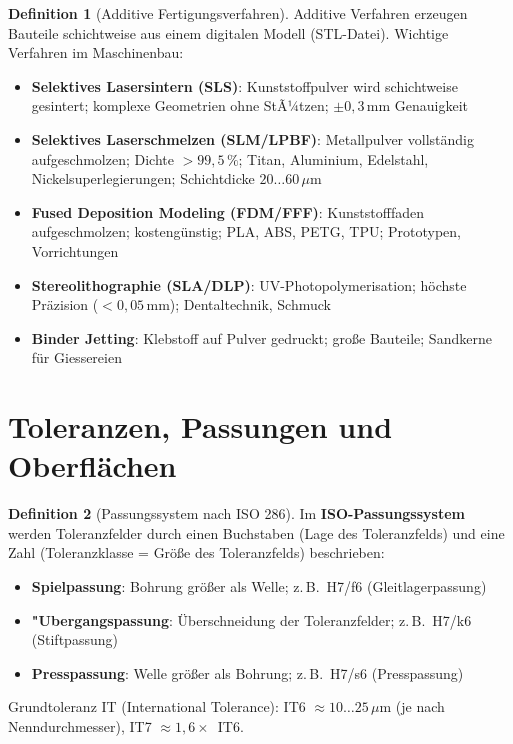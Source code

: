 ﻿\documentclass[a4paper,12pt]{report}
\theoremstyle{definition}
\newtheorem{definition}{Definition}
\begin{document}
\begin{definition}[Additive Fertigungsverfahren]
Additive Verfahren erzeugen Bauteile schichtweise aus einem digitalen Modell (STL-Datei).
Wichtige Verfahren im Maschinenbau:
\begin{itemize}
    \item[-] \textbf{Selektives Lasersintern (SLS)}: Kunststoffpulver wird schichtweise
          gesintert; komplexe Geometrien ohne StÃ¼tzen; $\pm 0{,}3\,\mathrm{mm}$ Genauigkeit
    \item[-] \textbf{Selektives Laserschmelzen (SLM/LPBF)}: Metallpulver vollst\"andig
          aufgeschmolzen; Dichte $> 99{,}5\,\%$; Titan, Aluminium, Edelstahl,
          Nickelsuperlegierungen; Schichtdicke $20\ldots60\,\mu\mathrm{m}$
    \item[-] \textbf{Fused Deposition Modeling (FDM/FFF)}: Kunststofffaden aufgeschmolzen;
          kosteng\"unstig; PLA, ABS, PETG, TPU; Prototypen, Vorrichtungen
    \item[-] \textbf{Stereolithographie (SLA/DLP)}: UV-Photopolymerisation;
          h\"ochste Pr\"azision ($< 0{,}05\,\mathrm{mm}$); Dentaltechnik, Schmuck
    \item[-] \textbf{Binder Jetting}: Klebstoff auf Pulver gedruckt; gro\ss{}e Bauteile;
          Sandkerne f\"ur Giessereien
\end{itemize}
\end{definition}

\section{Toleranzen, Passungen und Oberfl\"achen}

\begin{definition}[Passungssystem nach ISO 286]
Im \textbf{ISO-Passungssystem} werden Toleranzfelder durch einen Buchstaben
(Lage des Toleranzfelds) und eine Zahl (Toleranzklasse = Gr\"o\ss{}e des Toleranzfelds) beschrieben:
\begin{itemize}
    \item[-] \textbf{Spielpassung}: Bohrung gr\"o\ss{}er als Welle; z.\,B.\ H7/f6 (Gleitlagerpassung)
    \item[-] \textbf{"Ubergangspassung}: \"Uberschneidung der Toleranzfelder; z.\,B.\ H7/k6 (Stiftpassung)
    \item[-] \textbf{Presspassung}: Welle gr\"o\ss{}er als Bohrung; z.\,B.\ H7/s6 (Presspassung)
\end{itemize}
Grundtoleranz IT (International Tolerance): IT6 $\approx 10\ldots25\,\mu\mathrm{m}$
(je nach Nenndurchmesser), IT7 $\approx 1{,}6\times$~IT6.
\end{definition}
\end{document}
